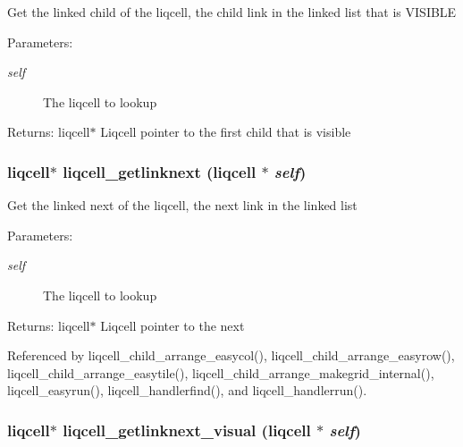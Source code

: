 Get the linked child of the liqcell, the child link in the linked list that is VISIBLE \begin{Desc}
\item[Parameters:]
\begin{description}
\item[{\em self}]The liqcell to lookup \end{description}
\end{Desc}
\begin{Desc}
\item[Returns:]liqcell$\ast$ Liqcell pointer to the first child that is visible \end{Desc}
\subsubsection[{liqcell\_\-getlinknext}]{\setlength{\rightskip}{0pt plus 5cm}liqcell$\ast$ liqcell\_\-getlinknext (liqcell $\ast$ {\em self})}\label{d5/da2/liqcell_8c_b321c98982c744ac08622fd06c4325f2}


Get the linked next of the liqcell, the next link in the linked list \begin{Desc}
\item[Parameters:]
\begin{description}
\item[{\em self}]The liqcell to lookup \end{description}
\end{Desc}
\begin{Desc}
\item[Returns:]liqcell$\ast$ Liqcell pointer to the next \end{Desc}


Referenced by liqcell\_\-child\_\-arrange\_\-easycol(), liqcell\_\-child\_\-arrange\_\-easyrow(), liqcell\_\-child\_\-arrange\_\-easytile(), liqcell\_\-child\_\-arrange\_\-makegrid\_\-internal(), liqcell\_\-easyrun(), liqcell\_\-handlerfind(), and liqcell\_\-handlerrun().
\subsubsection[{liqcell\_\-getlinknext\_\-visual}]{\setlength{\rightskip}{0pt plus 5cm}liqcell$\ast$ liqcell\_\-getlinknext\_\-visual (liqcell $\ast$ {\em self})}\label{d5/da2/liqcell_8c_1a5d99c5160dbe606054ca80a934f396}


